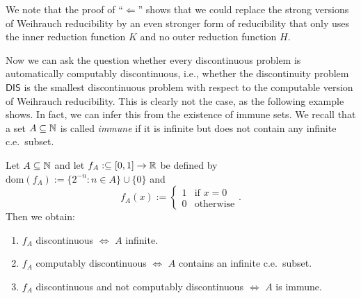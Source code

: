 \documentclass{amsart}
\def\IN{{\Bbb{N}}}
\def\IR{{\Bbb{R}}}
\def\In{\subseteq}
\def\dom{{\mathrm{dom}}}
\def\DIS{\mathsf{DIS}}
\begin{document}
We note that the proof of ``$\Longleftarrow$'' shows that we could replace the strong versions of Weihrauch reducibility by an even stronger form  of reducibility that only uses the inner reduction function $K$ and no outer reduction function $H$.

Now we can ask the question whether every discontinuous problem is automatically computably discontinuous, i.e.,
whether the discontinuity problem $\DIS$ is the smallest discontinuous problem with respect to the computable version of Weihrauch reducibility.
This is clearly not the case, as the following example shows. In fact, we can infer this from the existence of immune sets.
We recall that a set $A\In\IN$ is called {\em immune} if it is infinite but does not contain any infinite c.e.\ subset.

\begin{example}
\label{ex:immune}
Let $A\In\IN$ and let $f_A:\In[0,1]\to\IR$ be defined by $\dom(f_A):=\{2^{-n}:n\in A\}\cup\{0\}$ and
\[f_A(x):=\left\{\begin{array}{ll}
1 & \mbox{if $x=0$}\\
0 & \mbox{otherwise}
\end{array}\right..\]
Then we obtain:
\begin{enumerate}
\item $f_A$ discontinuous $\iff$ $A$ infinite.
\item $f_A$ computably discontinuous $\iff$ $A$ contains an infinite c.e.\ subset.
\item $f_A$ discontinuous and not computably discontinuous $\iff$ $A$ is immune.
\end{enumerate}
\end{example}
\end{document}
